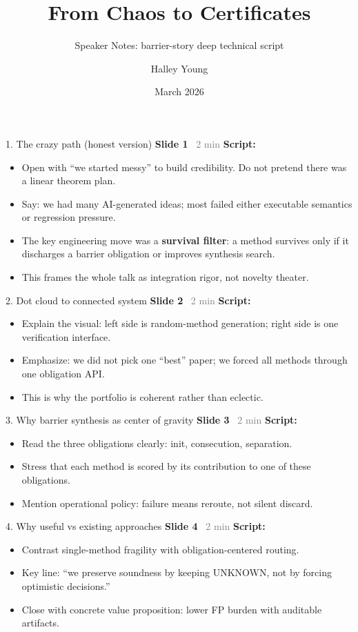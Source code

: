 \documentclass[aspectratio=169]{beamer}
\title{From Chaos to Certificates}
\subtitle{Speaker Notes: barrier-story deep technical script}
\author{Halley Young}
\date{March 2026}
\newcommand{\syncline}[2]{\textbf{#1} \hfill \textcolor{gray}{#2}}
\begin{document}
\begin{frame}
\titlepage
\end{frame}

\begin{frame}{1. The crazy path (honest version)}
\syncline{Slide 1}{~2 min}
\textbf{Script:}
\begin{itemize}
  \item Open with ``we started messy'' to build credibility. Do not pretend there was a linear theorem plan.
  \item Say: we had many AI-generated ideas; most failed either executable semantics or regression pressure.
  \item The key engineering move was a \textbf{survival filter}: a method survives only if it discharges a barrier obligation or improves synthesis search.
  \item This frames the whole talk as integration rigor, not novelty theater.
\end{itemize}
\end{frame}

\begin{frame}{2. Dot cloud to connected system}
\syncline{Slide 2}{~2 min}
\textbf{Script:}
\begin{itemize}
  \item Explain the visual: left side is random-method generation; right side is one verification interface.
  \item Emphasize: we did not pick one ``best'' paper; we forced all methods through one obligation API.
  \item This is why the portfolio is coherent rather than eclectic.
\end{itemize}
\end{frame}

\begin{frame}{3. Why barrier synthesis as center of gravity}
\syncline{Slide 3}{~2 min}
\textbf{Script:}
\begin{itemize}
  \item Read the three obligations clearly: init, consecution, separation.
  \item Stress that each method is scored by its contribution to one of these obligations.
  \item Mention operational policy: failure means reroute, not silent discard.
\end{itemize}
\end{frame}

\begin{frame}{4. Why useful vs existing approaches}
\syncline{Slide 4}{~2 min}
\textbf{Script:}
\begin{itemize}
  \item Contrast single-method fragility with obligation-centered routing.
  \item Key line: ``we preserve soundness by keeping UNKNOWN, not by forcing optimistic decisions.''
  \item Close with concrete value proposition: lower FP burden with auditable artifacts.
\end{itemize}
\end{frame}
\end{document}
